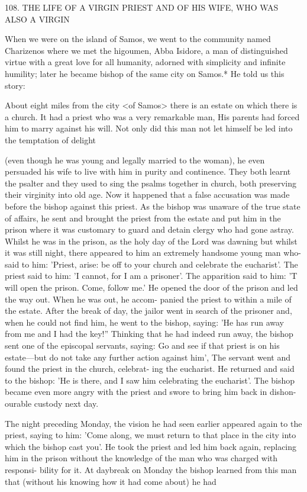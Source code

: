 108. THE LIFE OF A VIRGIN PRIEST AND OF
HIS WIFE, WHO WAS ALSO A VIRGIN

When we were on the island of Samos, we went to the community
named Charizenos where we met the higoumen, Abba Isidore, a
man of distinguished virtue with a great love for all humanity,
adorned with simplicity and infinite humility; later he became
bishop of the same city on Samos.* He told us this story:

About eight miles from the city <of Samos> there is an estate on
which there is a church. It had a priest who was a very remarkable
man, His parents had forced him to marry against his will. Not only
did this man not let himself be led into the temptation of delight

(even though he was young and legally married to the woman), he
even persuaded his wife to live with him in purity and continence.
They both learnt the psalter and they used to sing the psalms
together in church, both preserving their virginity into old age. Now
it happened that a false accusation was made before the bishop
against this priest. As the bishop was unaware of the true state of
affairs, he sent and brought the priest from the estate and put him
in the prison where it was customary to guard and detain clergy
who had gone astray. Whilst he was in the prison, as the holy day
of the Lord was dawning but whilst it was still night, there appeared
to him an extremely handsome young man who-said to him: 'Priest,
arise: be off to your church and celebrate the eucharist'. The priest
said to him: 'I cannot, for I am a prisoner'. The apparition said to
him: 'T will open the prison. Come, follow me.' He opened the door
of the prison and led the way out. When he was out, he accom-
panied the priest to within a mile of the estate. After the break of
day, the jailor went in search of the prisoner and, when he could
not find him, he went to the bishop, saying: 'He has run away from
me and I had the key!” Thinking that he had indeed run away, the
bishop sent one of the episcopal servants, saying: \textquotesingle Go and see if that
priest is on his estate—but do not take any further action against
him', The servant went and found the priest in the church, celebrat-
ing the eucharist. He returned and said to the bishop: 'He is there,
and I saw him celebrating the eucharist'. The bishop became even
more angry with the priest and swore to bring him back in dishon-
ourable custody next day.

The night preceding Monday, the vision he had seen earlier
appeared again to the priest, saying to him: 'Come along, we must
return to that place in the city into which the bishop cast you'. He
took the priest and led him back again, replacing him in the prison
without the knowledge of the man who was charged with responsi-
bility for it. At daybreak on Monday the bishop learned from this
man that (without his knowing how it had come about) he had

